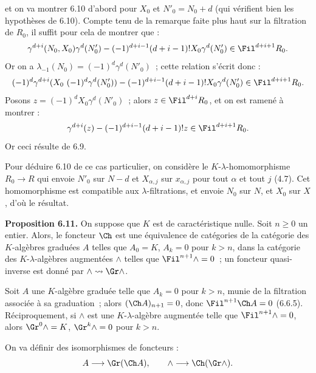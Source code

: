 
et on va
montrer 6.10 d'abord pour \(X_0\) et \(N'_0=N_0+d\) (qui vérifient bien les hypothèses de 6.10). Compte tenu de la remarque faite plus haut sur la filtration de \(R_0\), il suffit pour cela de montrer que :
\[
  \gamma^{d+i}(N_0,X_0)\gamma^d(N'_0)
  -
  (-1)^{d+i-1}(d+i-1)!X_0\gamma^d(N'_0)
  \in\Fil^{d+i+1}R_0 .
\]
Or on a \(\lambda_{-1}(N_0)=(-1)^d\gamma^d(N'_0)\)~; cette relation s'écrit donc :
\[
  (-1)^d\gamma^{d+i}(X_0\ (-1)^d\gamma^d(N'_0))
  -
  (-1)^{d+i-1}(d+i-1)!X_0\gamma^d(N'_0)
  \in\Fil^{d+i+1}R_0 .
\]
Posons \(z=(-1)^dX_0\gamma^d(N'_0)\)~; alors \(z\in\Fil^{d+i}R_0\), et on est ramené à montrer :
\[
  \gamma^{d+i}(z)-(-1)^{d+i-1}(d+i-1)!z\in\Fil^{d+i+1}R_0 .
\]
Or ceci résulte de 6.9.

Pour déduire 6.10 de ce cas particulier, on considère le \(K\)-\(\lambda\)-homomorphisme \(R_0\to R\) qui envoie \(N'_0\) sur \(N-d\) et \(X_{\alpha,j}\) sur \(x_{\alpha,j}\) pour tout \(\alpha\) et tout \(j\) (4.7). Cet homomorphisme est compatible aux \(\lambda\)-filtrations, et envoie \(N_0\) sur \(N\), et \(X_0\) sur \(X\), d'où le résultat.

\textbf{Proposition 6.11.} On suppose que \(K\) est de caractéristique nulle. Soit \(n\ge0\) un entier. Alors, le foncteur \(\Ch\) est une équivalence de catégories de la catégorie des \(K\)-algèbres graduées \(A\) telles que \(A_0=K\), \(A_k=0\) pour \(k>n\), dans la catégorie des \(K\)-\(\lambda\)-algèbres augmentées \(\mathord{\wedge}\) telles que \(\Fil^{n+1}\mathord{\wedge}=0\)~; un foncteur quasi-inverse est donné par \(\mathord{\wedge}\rightsquigarrow\Gr\mathord{\wedge}\).

Soit \(A\) une \(K\)-algèbre graduée telle que \(A_k=0\) pour \(k>n\), munie de la filtration associée à sa graduation~; alors \((\Ch A)_{n+1}=0\), donc \(\Fil^{n+1}\Ch A=0\) (6.6.5). Réciproquement, si \(\mathord{\wedge}\) est une \(K\)-\(\lambda\)-algèbre augmentée telle que \(\Fil^{n+1}\mathord{\wedge}=0\), alors \(\Gr^0\mathord{\wedge}=K\), \(\Gr^k\mathord{\wedge}=0\) pour \(k>n\).

On va définir des isomorphismes de foncteurs :
\[
  A\longrightarrow \Gr(\Ch A),
  \qquad
  \mathord{\wedge}\longrightarrow \Ch(\Gr\mathord{\wedge}).
\]
